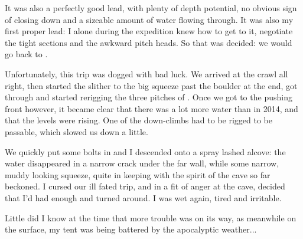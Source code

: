 It was also a perfectly good lead, with plenty of depth potential, no obvious sign of closing down and a sizeable amount of water flowing through. It was also my first proper lead: I alone during the expedition knew how to get to it, negotiate the tight sections and the awkward pitch heads. So that was decided: we would go back to . 

Unfortunately, this trip was dogged with bad luck. We arrived at the  crawl all right, then started the slither to the big squeeze past the boulder at the end, got through and started rerigging the three pitches of . Once we got to the pushing front however, it became clear that there was a lot more water than in 2014, and that the levels were rising. One of the down-climbs had to be rigged to be passable, which slowed us down a little.

We quickly put some bolts in and I descended onto a spray lashed alcove: the water disappeared in a narrow crack under the far wall, while some narrow, muddy looking squeeze, quite in keeping with the spirit of the cave so far beckoned. I cursed our ill fated trip, and in a fit of anger at the cave, decided that I'd had enough and turned around. I was wet again, tired and irritable. 

Little did I know at the time that more trouble was on its way, as meanwhile on the surface, my tent was being battered by the apocalyptic weather...

